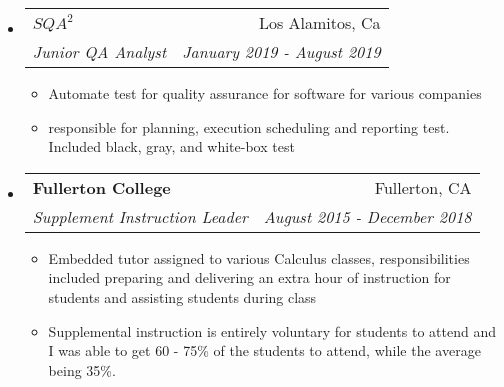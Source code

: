 \documentclass[letterpaper,11pt]{article}
\makeatletter
\newcommand{\resitem}[1]{\item #1 \vspace{-2pt}}
\newcommand{\ressubheading}[4]{
\begin{tabular*}{6.5in}{l@{\extracolsep{\fill}}r}
		\textbf{#1} & #2 \\
		\textit{#3} & \textit{#4} \\
\end{tabular*}\vspace{-10pt}}
\makeatother
\begin{document}
\begin{itemize}
\item
	\ressubheading{\boldmath$SQA^2$}{Los Alamitos, Ca}{Junior QA Analyst}{January 2019 - August 2019}
	\begin{itemize}
		\resitem{Automate test for quality assurance for software for various companies}
 		\resitem{responsible for planning, execution scheduling and reporting test. Included black, gray, and white-box test}
	\end{itemize}

\end{itemize}


\begin{itemize}
\item
	\ressubheading{Fullerton College}{Fullerton, CA}{Supplement Instruction Leader}{August 2015 - December 2018}
	\begin{itemize}
		\resitem{Embedded tutor assigned to various Calculus classes, responsibilities included preparing and delivering an extra hour of instruction for students and assisting students during class}
		\resitem{Supplemental instruction is entirely voluntary for students to attend and I was able to get 60 - 75\% of the students to attend, while the average being 35\%.}
	\end{itemize}

\end{itemize}
\end{document}
